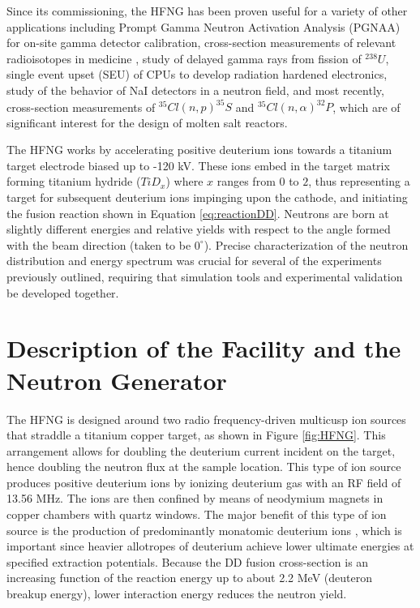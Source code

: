 \documentclass[review]{elsarticle}
\begin{document}
Since its commissioning, the HFNG has been proven useful for a variety of other applications including Prompt Gamma Neutron Activation Analysis (PGNAA) for on-site gamma detector calibration, cross-section measurements of relevant radioisotopes in medicine \cite{np_paper}, study of delayed gamma rays from fission of $^{238}U$, single event upset (SEU) of CPUs to develop radiation hardened electronics, study of the behavior of NaI detectors in a neutron field, and most recently, cross-section measurements of $^{35}Cl(n,p)^{35}S$ and $^{35}Cl(n,\alpha)^{32}P$, which are of significant interest for the design of molten salt reactors. 

The HFNG works by accelerating positive deuterium ions towards a titanium target electrode biased up to -120 kV. These ions embed in the target matrix forming titanium hydride ($TiD_x$) where $x$ ranges from $0$ to $2$, thus representing a target for subsequent deuterium ions impinging upon the cathode, and initiating the fusion reaction shown in Equation \ref{eq:reactionDD}. Neutrons are born at slightly different energies and relative yields with respect to the angle formed with the beam direction (taken to be $0^{\circ}$). Precise characterization of the neutron distribution and energy spectrum was crucial for several of the experiments previously outlined, requiring that simulation tools and experimental validation be developed together.
	
\section{Description of the Facility and the Neutron Generator}
	
The HFNG is designed around two radio frequency-driven multicusp ion sources that straddle a titanium copper target, as shown in Figure \ref{fig:HFNG}. This arrangement allows for doubling the deuterium current incident on the target, hence doubling the neutron flux at the sample location. This type of ion source produces positive deuterium ions by ionizing deuterium gas with an RF field of 13.56 MHz. The ions are then confined by means of neodymium magnets in copper chambers with quartz windows. The major benefit of this type of ion source is the production of predominantly monatomic deuterium ions \cite{wuThesis}, which is important since heavier allotropes of deuterium achieve lower ultimate energies at specified extraction potentials. Because the DD fusion cross-section is an increasing function of the reaction energy up to about 2.2 MeV (deuteron breakup energy), lower interaction energy reduces the neutron yield.   
\end{document}
